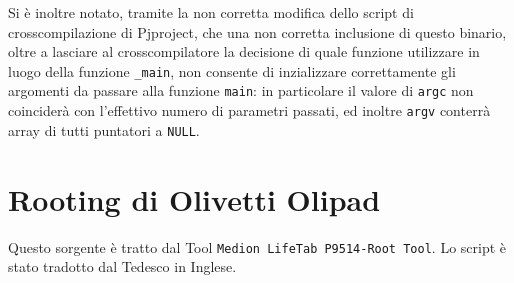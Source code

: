 Si è inoltre notato, tramite la non corretta modifica dello script di crosscompilazione
di Pjproject, che una non corretta inclusione di questo binario, oltre a lasciare
al crosscompilatore la decisione di quale funzione utilizzare in luogo della
funzione \texttt{\small \_main}, non consente di inzializzare correttamente gli
argomenti da passare alla funzione \texttt{\small main}: in particolare il valore di
\texttt{\small argc} non coinciderà con l'effettivo numero di parametri passati, ed
inoltre \texttt{\small argv} conterrà array di tutti puntatori a \texttt{\small NULL}.

\section{Rooting di Olivetti Olipad}\label{sec:rootolipad_src}
Questo sorgente è tratto dal Tool \texttt{Medion LifeTab P9514-Root Tool}. Lo script
è stato tradotto dal Tedesco in Inglese.


